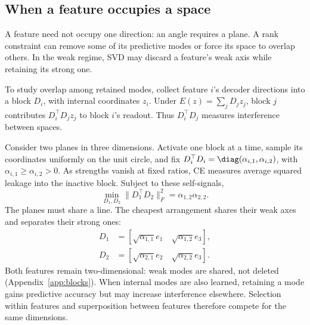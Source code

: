 \subsection{When a feature occupies a space}

A feature need not occupy one direction: an angle requires a plane. A rank constraint can remove some of its predictive modes or force its space to overlap others. In the weak regime, SVD may discard a feature's weak axis while retaining its strong one.

To study overlap among retained modes, collect feature $i$'s decoder directions into a block $D_i$, with internal coordinates $z_i$. Under $E(z)=\sum_jD_jz_j$, block $j$ contributes $D_i^\top D_jz_j$ to block $i$'s readout. Thus $D_i^\top D_j$ measures interference between spaces.

Consider two planes in three dimensions. Activate one block at a time, sample its coordinates uniformly on the unit circle, and fix $D_i^\top D_i=\diag(\alpha_{i,1},\alpha_{i,2})$, with $\alpha_{i,1}\ge\alpha_{i,2}>0$. As strengths vanish at fixed ratios, CE measures average squared leakage into the inactive block. Subject to these self-signals,
\begin{equation}
\boxed{\min_{D_1,D_2}\|D_1^\top D_2\|_F^2=\alpha_{1,2}\alpha_{2,2}.}
\label{eq:block-min}
\end{equation}
The planes must share a line. The cheapest arrangement shares their weak axes and separates their strong ones:
\begin{equation}
\begin{aligned}
D_1&=[\sqrt{\alpha_{1,1}}e_1\quad\sqrt{\alpha_{1,2}}e_3],\\
D_2&=[\sqrt{\alpha_{2,1}}e_2\quad\sqrt{\alpha_{2,2}}e_3].
\end{aligned}
\label{eq:block-solution}
\end{equation}
Both features remain two-dimensional: weak modes are shared, not deleted (Appendix~\ref{app:blocks}). When internal modes are also learned, retaining a mode gains predictive accuracy but may increase interference elsewhere. Selection within features and superposition between features therefore compete for the same dimensions.
\label{main:end}